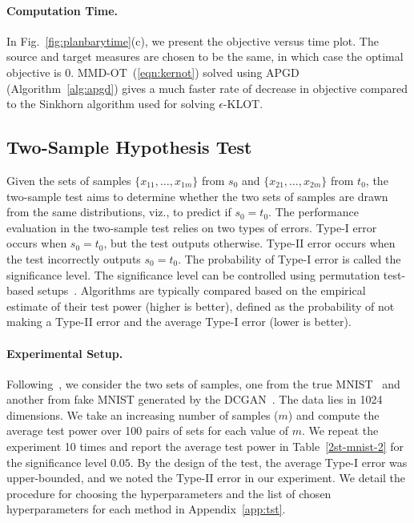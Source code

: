 \paragraph{Computation Time.}
In Fig.~\ref{fig:planbarytime}(c), we present the objective versus time plot. The source and target measures are chosen to be the same, in which case the optimal objective is 0. MMD-OT~(\ref{eqn:kernot}) solved using APGD (Algorithm~\ref{alg:apgd}) gives a much faster rate of decrease in objective compared to the Sinkhorn algorithm used for solving $\epsilon$-KLOT.

\subsection{Two-Sample Hypothesis Test}\label{exp:tst}
Given the sets of samples $\{x_{11}, \dots, x_{1m}\}$ from $ s_0$ and $\{x_{21}, \dots, x_{2m}\}$ from $t_0$, the two-sample test aims to determine whether the two sets of samples are drawn from the same distributions, viz., to predict if $s_0=t_0$. The performance evaluation in the two-sample test relies on two types of errors. Type-I error occurs when $s_0=t_0$, but the test outputs otherwise. Type-II error occurs when the test incorrectly outputs $s_0=t_0$. The probability of Type-I error is called the significance level. The significance level can be controlled using permutation test-based setups~\citep{permutn,dktst}. Algorithms are typically compared based on the empirical estimate of their test power (higher is better), defined as the probability of not making a Type-II error and the average Type-I error (lower is better). 

\paragraph{Experimental Setup.} Following~\cite{dktst}, we consider the two sets of samples, one from the true MNIST~\citep{lecun-mnisthandwrittendigit-2010} and another from fake MNIST generated by the DCGAN~\citep{dcgan}. The data lies in 1024 dimensions. We take an increasing number of samples ($m$) and compute the average test power over 100 pairs of sets for each value of $m$. We repeat the experiment 10 times and report the average test power in Table~\ref{2st-mnist-2} for the significance level $0.05$. By the design of the test, the average Type-I error was upper-bounded, and we noted the Type-II error in our experiment. We detail the procedure for choosing the hyperparameters and the list of chosen hyperparameters for each method in Appendix~\ref{app:tst}.

